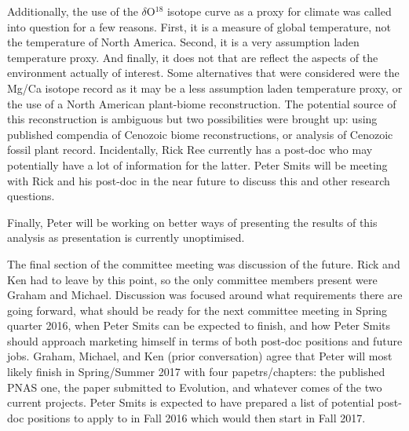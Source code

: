 \documentclass{article}
\begin{document}
Additionally, the use of the \(\delta\)O\(^{18}\) isotope curve as a proxy for climate was called into question for a few reasons. First, it is a measure of global temperature, not the temperature of North America. Second, it is a very assumption laden temperature proxy. And finally, it does not that are reflect the aspects of the environment actually of interest. Some alternatives that were considered were the Mg/Ca isotope record as it may be a less assumption laden temperature proxy, or the use of a North American plant-biome reconstruction. The potential source of this reconstruction is ambiguous but two possibilities were brought up: using published compendia of Cenozoic biome reconstructions, or analysis of Cenozoic fossil plant record. Incidentally, Rick Ree currently has a post-doc who may potentially have a lot of information for the latter. Peter Smits will be meeting with Rick and his post-doc in the near future to discuss this and other research questions.

Finally, Peter will be working on better ways of presenting the results of this analysis as presentation is currently unoptimised.

The final section of the committee meeting was discussion of the future. Rick and Ken had to leave by this point, so the only committee members present were Graham and Michael. Discussion was focused around what requirements there are going forward, what should be ready for the next committee meeting in Spring quarter 2016, when Peter Smits can be expected to finish, and how Peter Smits should approach marketing himself in terms of both post-doc positions and future jobs. Graham, Michael, and Ken (prior conversation) agree that Peter will most likely finish in Spring/Summer 2017 with four papetrs/chapters: the published PNAS one, the paper submitted to Evolution, and whatever comes of the two current projects. Peter Smits is expected to have prepared a list of potential post-doc positions to apply to in Fall 2016 which would then start in Fall 2017. 
\end{document}
